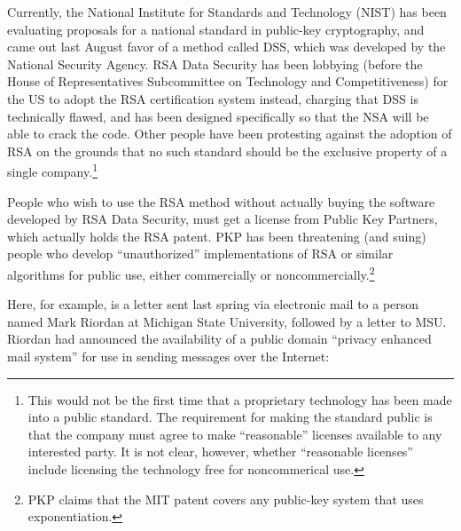 Currently, the National Institute for Standards and Technology (NIST)
has been evaluating proposals for a national standard in public-key
cryptography, and came out last August favor of a method called DSS,
which was developed by the National Security Agency.  RSA Data
Security has been lobbying (before the House of Representatives
Subcommittee on Technology and Competitiveness) for the US to adopt
the RSA certification system instead, charging that DSS is technically
flawed, and has been designed specifically so that the NSA will be
able to crack the code.  Other people have been protesting against the
adoption of RSA on the grounds that no such standard should be the
exclusive property of a single company.\footnote{This would not be the
first time that a proprietary technology has been made into a public
standard.  The requirement for making the standard public is that the
company must agree to make ``reasonable'' licenses available to any
interested party.  It is not clear, however, whether ``reasonable
licenses'' include licensing the technology free for noncommerical
use.}

People who wish to use the RSA method without actually buying the
software developed by RSA Data Security, must get a license from
Public Key Partners, which actually holds the RSA patent.  PKP has
been threatening (and suing) people who develop ``unauthorized''
implementations of RSA or similar algorithms for public use, either
commercially or noncommercially.\footnote{PKP claims that the MIT
patent covers any public-key system that uses exponentiation.}

Here, for example, is a letter sent last spring via electronic mail to
a person named Mark Riordan at Michigan State University, followed by
a letter to MSU. Riordan had announced the availability of a public
domain ``privacy enhanced mail system'' for use in sending messages
over the Internet:


